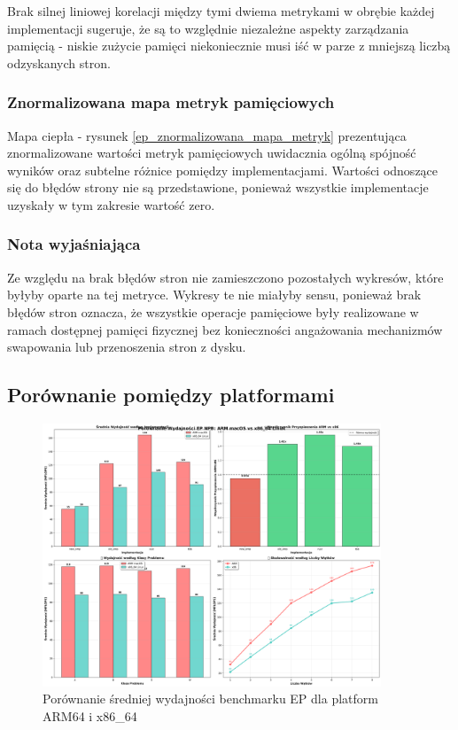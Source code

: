 Brak silnej liniowej korelacji między tymi dwiema metrykami w obrębie każdej implementacji sugeruje, że są to względnie niezależne aspekty zarządzania pamięcią - niskie zużycie pamięci niekoniecznie musi iść w parze z mniejszą liczbą odzyskanych stron.

\subsubsection{Znormalizowana mapa metryk pamięciowych}
Mapa ciepła - rysunek \ref{ep_znormalizowana_mapa_metryk} prezentująca znormalizowane wartości metryk pamięciowych uwidacznia ogólną spójność wyników oraz subtelne różnice pomiędzy implementacjami. Wartości odnoszące się do błędów strony nie są przedstawione, ponieważ wszystkie implementacje uzyskały w tym zakresie wartość zero.

\subsubsection{Nota wyjaśniająca}
Ze względu na brak błędów stron nie zamieszczono pozostałych wykresów, które byłyby oparte na tej metryce. Wykresy te nie miałyby sensu, ponieważ brak błędów stron oznacza, że wszystkie operacje pamięciowe były realizowane w ramach dostępnej pamięci fizycznej bez konieczności angażowania mechanizmów swapowania lub przenoszenia stron z dysku.


\subsection{Porównanie pomiędzy platformami}
\begin{figure}[H]
    \centering
    \includegraphics[width=0.9\textwidth]{analiza/images/parallel/ep/compare/ep_porownanie_platform_arm_vs_x86.png}
    \caption{Porównanie średniej wydajności benchmarku EP dla platform ARM64 i x86\_64}
    \label{ep_porownanie_platform_arm_vs_x86}
\end{figure}
